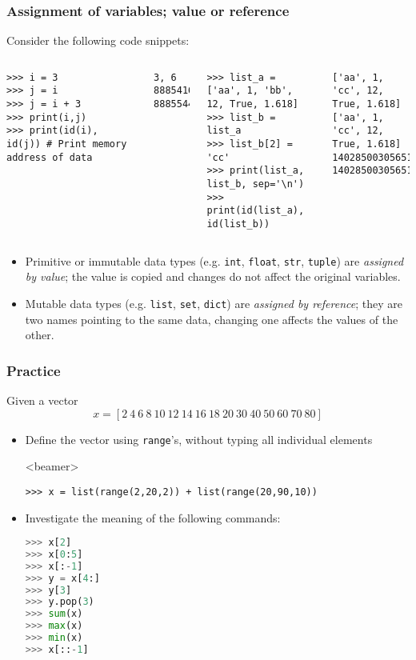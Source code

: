 \begin{frame}[fragile]
  \frametitle{Assignment of variables; value or reference}
  Consider the following code snippets:
  \begin{columns}[t]
    \begin{lstlisting}
>>> i = 3
>>> j = i 
>>> j = i + 3
>>> print(i,j)
>>> print(id(i), id(j)) # Print memory address of data
    \end{lstlisting}\pause
    \begin{lstlisting}[style=PyOutput]
3, 6
8885416 8885544
    \end{lstlisting}\pause
    \begin{lstlisting}
>>> list_a = ['aa', 1, 'bb', 12, True, 1.618]
>>> list_b = list_a
>>> list_b[2] = 'cc'
>>> print(list_a, list_b, sep='\n')
>>> print(id(list_a), id(list_b))
    \end{lstlisting}\pause
    \begin{lstlisting}[style=PyOutput]
['aa', 1, 'cc', 12, True, 1.618]
['aa', 1, 'cc', 12, True, 1.618]
140285003056512 140285003056512
    \end{lstlisting}\pause
  \end{columns}
  \begin{itemize}
    \item Primitive or immutable data types (e.g. \lstinline|int|, \lstinline|float|, \lstinline|str|, \lstinline|tuple|) are \emph{assigned by value}; the value is copied and changes do not affect the original variables.
    \item Mutable data types (e.g. \lstinline|list|, \lstinline|set|, \lstinline|dict|) are \emph{assigned by reference}; they are two names pointing to the same data, changing one affects the values of the other.
  \end{itemize}
\end{frame}


\begin{frame}[fragile]
  \frametitle{Practice}
  Given a vector 
  \[ 
     x = \left[2 \ 4 \ 6 \ 8 \ 10 \ 12 \ 14 \ 16 \ 18 \ 20 \ 30 \ 40 \ 50 \ 60 \ 70 \ 80 \right]
  \]
  \begin{itemize}
   \item Define the vector using \lstinline|range|'s, without typing all individual elements
   \pause
   \begin{onlyenv}<beamer> 
    \begin{lstlisting}[]
>>> x = list(range(2,20,2)) + list(range(20,90,10))
     \end{lstlisting}
     \pause
    \end{onlyenv}
   \item Investigate the meaning of the following commands:
   \begin{lstlisting}[language=Python, numbers=none]
>>> x[2]            
>>> x[0:5]          
>>> x[:-1]          
>>> y = x[4:]       
>>> y[3]            
>>> y.pop(3)      
>>> sum(x)    
>>> max(x)       
>>> min(x) 
>>> x[::-1]       
     \end{lstlisting}    
  \end{itemize}
 \end{frame}

